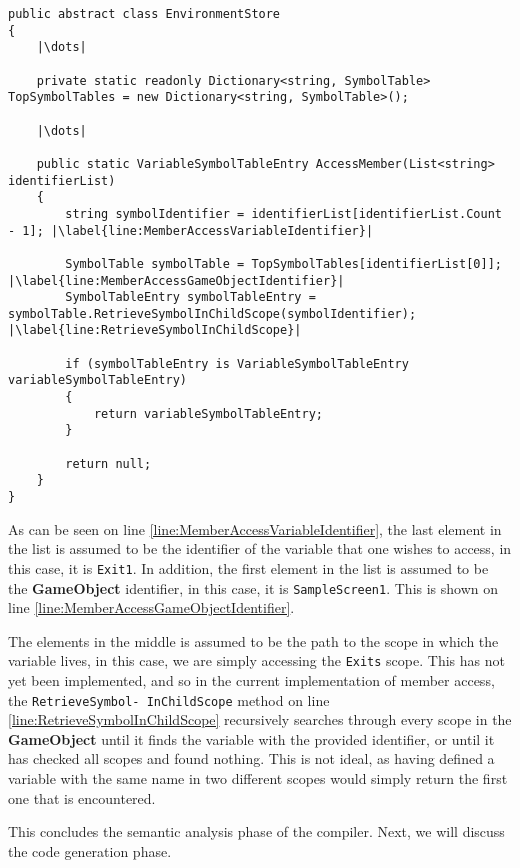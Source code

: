 \begin{lstlisting}[language=CSharp, caption={Visit assignment}, label={lst:VisitAssignment},escapechar=|]
public abstract class EnvironmentStore
{
	|\dots|

	private static readonly Dictionary<string, SymbolTable> TopSymbolTables = new Dictionary<string, SymbolTable>();
	
	|\dots|

	public static VariableSymbolTableEntry AccessMember(List<string> identifierList)
	{
		string symbolIdentifier = identifierList[identifierList.Count - 1]; |\label{line:MemberAccessVariableIdentifier}|
		
		SymbolTable symbolTable = TopSymbolTables[identifierList[0]]; |\label{line:MemberAccessGameObjectIdentifier}|
		SymbolTableEntry symbolTableEntry = symbolTable.RetrieveSymbolInChildScope(symbolIdentifier); |\label{line:RetrieveSymbolInChildScope}|

		if (symbolTableEntry is VariableSymbolTableEntry variableSymbolTableEntry)
		{
			return variableSymbolTableEntry;
		}
		
		return null;
	}
}
\end{lstlisting}

As can be seen on line \ref{line:MemberAccessVariableIdentifier}, the last element in the list is assumed to be the identifier of the variable that one wishes to access, in this case, it is \texttt{Exit1}.
In addition, the first element in the list is assumed to be the \textbf{GameObject} identifier, in this case, it is \texttt{SampleScreen1}. 
This is shown on line \ref{line:MemberAccessGameObjectIdentifier}.

The elements in the middle is assumed to be the path to the scope in which the variable lives, in this case, we are simply accessing the \texttt{Exits} scope. 
This has not yet been implemented, and so in the current implementation of member access, the \texttt{RetrieveSymbol-
InChildScope} method on line \ref{line:RetrieveSymbolInChildScope} recursively searches through every scope in the \textbf{GameObject} until it finds the variable with the provided identifier, or until it has checked all scopes and found nothing. This is not ideal, as having defined a variable with the same name in two different scopes would simply return the first one that is encountered.


This concludes the semantic analysis phase of the compiler. Next, we will discuss the code generation phase.
